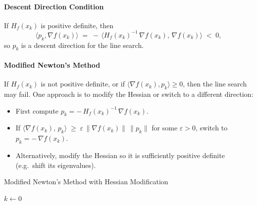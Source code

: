 \paragraph{Descent Direction Condition}
If \(H_f(x_k)\) is positive definite, then
\[
    \langle p_k, \nabla f(x_k)\rangle
    \;=\;
    -\,\langle H_f(x_k)^{-1}\,\nabla f(x_k),\,\nabla f(x_k)\rangle
    \;<\; 0,
\]
so \(p_k\) is a descent direction for the line search.

\paragraph{Modified Newton's Method}
If \(H_f(x_k)\) is not positive definite, or if \(\langle \nabla f(x_k), p_k\rangle \geq 0\), then the line search may fail. One approach is to modify the Hessian or switch to a different direction:

\begin{itemize}
    \item First compute \(p_k = -\,H_f(x_k)^{-1}\,\nabla f(x_k)\).
    \item If \(\langle \nabla f(x_k),\,p_k\rangle \;\ge\; \varepsilon \,\|\nabla f(x_k)\|\,\|p_k\|\) for some \(\varepsilon > 0\), switch to \(p_k = -\,\nabla f(x_k)\).
    \item Alternatively, modify the Hessian so it is sufficiently positive definite (e.g.\ shift its eigenvalues).
\end{itemize}

\begin{algorithm}[H]
\caption{Modified Newton's Method with Hessian Modification}
\label{alg:newton-modified}
 \(k \gets 0\)\;
\;
\end{algorithm}


